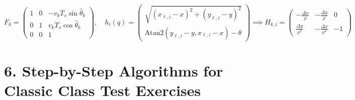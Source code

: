 \documentclass[10pt, a4paper]{article}
\begin{document}
\begin{itemize}
    \[
        F_k = \begin{pmatrix} 1 & 0 & -v_k T_s\sin\hat{\theta}_k \\ 0 & 1 & v_k T_s\cos\hat{\theta}_k \\ 0 & 0 & 1 \end{pmatrix}, \quad h_i(q) = \begin{pmatrix} \sqrt{(x_{\ell,i}-x)^2 + (y_{\ell,i}-y)^2} \\ \text{Atan2}(y_{\ell,i}-y, x_{\ell,i}-x) - \theta \end{pmatrix} \implies H_{k,i} = \begin{pmatrix} -\frac{\Delta x}{\rho} & -\frac{\Delta y}{\rho} & 0 \\ \frac{\Delta y}{\rho^2} & -\frac{\Delta x}{\rho^2} & -1 \end{pmatrix}
    \]
\end{itemize}

\newpage

\section*{6. Step-by-Step Algorithms for Classic Class Test Exercises}
\end{document}
